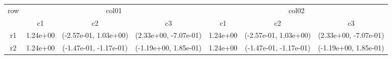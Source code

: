 \begin{tabular}{ccccccc}
\toprule
\multirow{2}{*}{row}&\multicolumn{3}{c}{col01}&\multicolumn{3}{c}{col02}\tabularnewline
\cmidrule(lr){2-4}
\cmidrule(lr){5-7}
&c1&c2&c3&c1&c2&c3\tabularnewline
\midrule
r1&1.24e+00& (-2.57e-01, 1.03e+00)& (2.33e+00, -7.07e-01)&1.24e+00& (-2.57e-01, 1.03e+00)& (2.33e+00, -7.07e-01)\tabularnewline
r2&1.24e+00& (-1.47e-01, -1.17e-01)& (-1.19e+00, 1.85e-01)&1.24e+00& (-1.47e-01, -1.17e-01)& (-1.19e+00, 1.85e-01)\tabularnewline
\bottomrule
\end{tabular}
